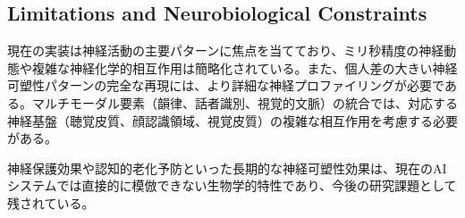 \subsection{Limitations and Neurobiological Constraints}

現在の実装は神経活動の主要パターンに焦点を当てており、ミリ秒精度の神経動態や複雑な神経化学的相互作用は簡略化されている。また、個人差の大きい神経可塑性パターンの完全な再現には、より詳細な神経プロファイリングが必要である。マルチモーダル要素（韻律、話者識別、視覚的文脈）の統合では、対応する神経基盤（聴覚皮質、顔認識領域、視覚皮質）の複雑な相互作用を考慮する必要がある。

神経保護効果や認知的老化予防といった長期的な神経可塑性効果は、現在のAIシステムでは直接的に模倣できない生物学的特性であり、今後の研究課題として残されている。 